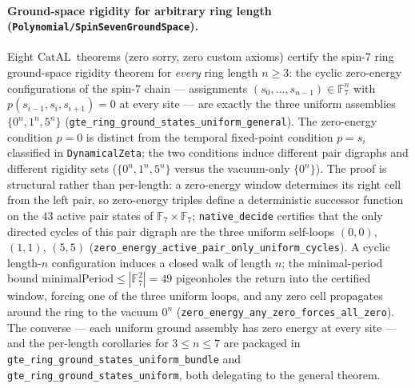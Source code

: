 \documentclass[11pt,a4paper]{article}
\theoremstyle{definition}
\newcommand{\CatAL}{\ensuremath{\mathrm{CatAL}}}
\begin{document}
\paragraph{Ground-space rigidity for arbitrary ring length
  (\texttt{Polynomial/\allowbreak SpinSevenGroundSpace}).}
Eight \CatAL\ theorems (zero sorry, zero custom axioms) certify the spin-7
ring ground-space rigidity theorem for \emph{every} ring length $n \ge 3$:
the cyclic zero-energy configurations of the spin-7 chain --- assignments
$(s_0,\dots,s_{n-1}) \in \mathbb{F}_7^n$ with $p(s_{i-1},s_i,s_{i+1}) = 0$
at every site --- are exactly the three uniform assemblies
$\{0^n, 1^n, 5^n\}$
(\texttt{gte\_ring\_ground\_states\_uniform\_general}).
The zero-energy condition $p=0$ is distinct from the temporal fixed-point
condition $p = s_i$ classified in \texttt{DynamicalZeta}; the two conditions
induce different pair digraphs and different rigidity sets
($\{0^n,1^n,5^n\}$ versus the vacuum-only $\{0^n\}$).
The proof is structural rather than per-length: a zero-energy window
determines its right cell from the left pair, so zero-energy triples define
a deterministic successor function on the $43$ active pair states of
$\mathbb{F}_7\times\mathbb{F}_7$; \texttt{native\_decide} certifies that the
only directed cycles of this pair digraph are the three uniform self-loops
$(0,0)$, $(1,1)$, $(5,5)$
(\texttt{zero\_energy\_active\_pair\_only\_uniform\_cycles}).
A cyclic length-$n$ configuration induces a closed walk of length $n$; the
minimal-period bound $\mathrm{minimalPeriod} \le |\mathbb{F}_7^2| = 49$
pigeonholes the return into the certified window, forcing one of the three
uniform loops, and any zero cell propagates around the ring to the vacuum
$0^n$ (\texttt{zero\_energy\_any\_zero\_forces\_all\_zero}).
The converse --- each uniform ground assembly has zero energy at every
site --- and the per-length corollaries for $3 \le n \le 7$ are packaged in
\texttt{gte\_ring\_ground\_states\_uniform\_bundle} and
\texttt{gte\_ring\_ground\_states\_uniform}, both delegating to the general
theorem.
\end{document}
